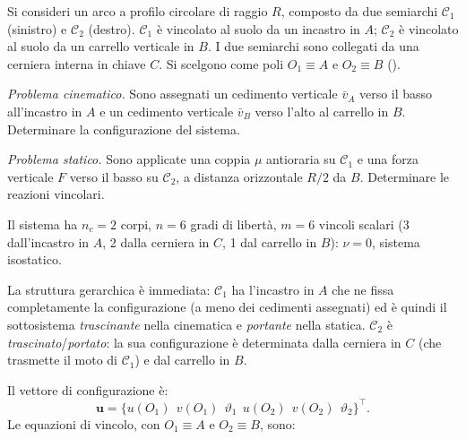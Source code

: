 \begin{esempio}
	\label{ex:arco_incastro}
	Si consideri un arco a profilo circolare di raggio $R$,
	composto da due semiarchi $\mathcal{C}_1$ (sinistro) e
	$\mathcal{C}_2$ (destro). $\mathcal{C}_1$ è vincolato
	al suolo da un incastro in $A$; $\mathcal{C}_2$ è
	vincolato al suolo da un carrello verticale in $B$.
	I due semiarchi sono collegati da una cerniera interna
	in chiave $C$. Si scelgono come poli $O_1 \equiv A$
	e $O_2 \equiv B$ ().
	
	\smallskip
	\noindent\textit{Problema cinematico.}
	Sono assegnati un cedimento verticale $\bar{v}_A$ verso
	il basso all'incastro in $A$ e un cedimento verticale
	$\bar{v}_B$ verso l'alto al carrello in $B$. Determinare
	la configurazione del sistema.
	
	\smallskip
	\noindent\textit{Problema statico.}
	Sono applicate una coppia $\mu$ antioraria su
	$\mathcal{C}_1$ e una forza verticale $F$ verso il basso
	su $\mathcal{C}_2$, a distanza orizzontale $R/2$ da $B$.
	Determinare le reazioni vincolari.
	



	
	\begin{svolgimento}
		
		Il sistema ha $n_c = 2$ corpi, $n = 6$ gradi di libertà,
		$m = 6$ vincoli scalari (3 dall'incastro in $A$, 2 dalla
		cerniera in $C$, 1 dal carrello in $B$): $\nu = 0$,
		sistema isostatico.
		
		La struttura gerarchica è immediata: $\mathcal{C}_1$ ha
		l'incastro in $A$ che ne fissa completamente la
		configurazione (a meno dei cedimenti assegnati) ed è
		quindi il sottosistema \emph{trascinante} nella
		cinematica e \emph{portante} nella statica.
		$\mathcal{C}_2$ è \emph{trascinato}/\emph{portato}:
		la sua configurazione è determinata dalla cerniera in
		$C$ (che trasmette il moto di $\mathcal{C}_1$) e dal
		carrello in $B$.
		
		Il vettore di configurazione è:
		\[
		\bm{u} =
		\bigl\{
		u(O_1)\,\; v(O_1)\,\; \vartheta_1\,\;
		u(O_2)\,\; v(O_2)\,\; \vartheta_2
		\bigr\}^\top.
		\]
		Le equazioni di vincolo, con $O_1\equiv A$ e
		$O_2\equiv B$, sono:
		

\end{svolgimento}
\end{esempio}
